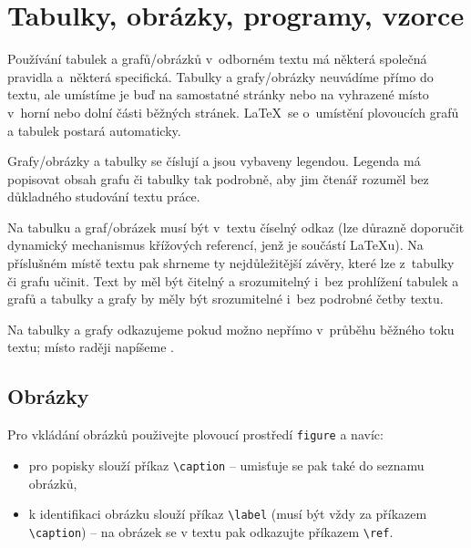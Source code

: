 
\chapter{Tabulky, obrázky, programy, vzorce}

Používání tabulek a grafů/obrázků v~odborném textu má některá společná pravidla a~některá specifická. Tabulky a grafy/obrázky neuvádíme přímo do textu, ale umístíme je buď na samostatné stránky nebo na vyhrazené místo v~horní nebo dolní části běžných stránek. \LaTeX\ se o~umístění plovoucích grafů a tabulek postará automaticky.

Grafy/obrázky a tabulky se číslují a jsou vybaveny legendou. Legenda má popisovat obsah grafu či tabulky tak podrobně, aby jim čtenář rozuměl bez důkladného studování textu práce.

Na tabulku a graf/obrázek musí být v~textu číselný odkaz (lze důrazně doporučit dynamický mechanismus křížových referencí, jenž je součástí \LaTeX u). Na příslušném místě textu pak shrneme ty nejdůležitější závěry, které lze z~tabulky či grafu učinit. Text by měl být čitelný a srozumitelný i~bez prohlížení tabulek a grafů a tabulky a grafy by měly být srozumitelné i~bez podrobné četby textu.

Na tabulky a grafy odkazujeme pokud možno nepřímo v~průběhu běžného
toku textu; místo \emph{} raději napíšeme
\emph{}.

\section{Obrázky}

Pro vkládání obrázků použivejte plovoucí prostředí \verb|figure| a navíc:
\begin{itemize}
\item pro popisky slouží příkaz \verb|\caption| -- umisťuje se pak také do seznamu obrázků,
\item k identifikaci obrázku slouží příkaz \verb|\label| (musí být vždy za příkazem \verb|\caption|) -- na obrázek se v textu pak odkazujte příkazem \verb|\ref|.
\end{itemize}


